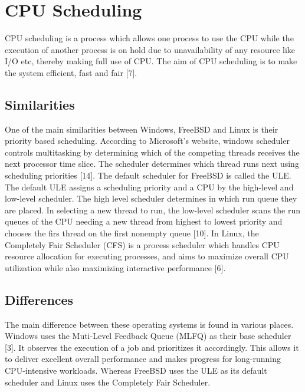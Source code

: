 \documentclass[letterpaper,10pt,titlepage]{article}
\begin{document}
\section{CPU Scheduling}

CPU scheduling is a process which allows one process to use the CPU while the execution of another process is on hold due to unavailability of any resource like I/O etc, thereby making full use of CPU. The aim of CPU scheduling is to make the system efficient, fast and fair [7].

\subsection{Similarities}

One of the main similarities between Windows, FreeBSD and Linux is their priority based scheduling. According to Microsoft’s website, windows scheduler controls multitasking by determining which of the competing threads receives the next processor time slice. The scheduler determines which thread runs next using scheduling priorities [14]. The default scheduler for FreeBSD is called the ULE. The default ULE assigns a scheduling priority and a CPU by the high-level and low-level scheduler. The high level scheduler determines in which run queue they are placed. In selecting a new thread to run, the low-level scheduler scans the run queues of the CPU needing a new thread from highest to lowest priority and chooses the firs thread on the first nonempty queue [10]. In Linux, the Completely Fair Scheduler (CFS) is a process scheduler which handles CPU resource allocation for executing processes, and aims to maximize overall CPU utilization while also maximizing interactive performance [6]. \\


\subsection{Differences}

The main difference between these operating systems is found in various places. Windows uses the Muti-Level Feedback Queue (MLFQ) as their base scheduler [3]. It observes the execution of a job and prioritizes it accordingly. This allows it to deliver excellent overall performance and makes progress for long-running CPU-intensive workloads. Whereas FreeBSD uses the ULE as its default scheduler and Linux uses the Completely Fair Scheduler.\\
\end{document}
